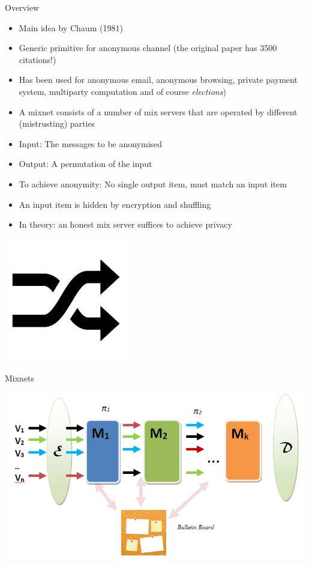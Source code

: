 \documentclass{beamer}
\newcommand*{\addsp}{\usebeamertemplate*{section page1}}
\begin{document}
\begin{frame}
\addsp
\end{frame}

\begin{frame}{Overview}
\begin{itemize}
\item Main idea by Chaum (1981)
\item Generic primitive for anonymous channel (the original paper has 3500 citations!)
\item Has been used for anonymous email, anonymous browsing, private payment system, multiparty computation and of course \textit{elections})
\item A mixnet consists of a number of mix servers that are operated by different (mistrusting) parties
\item Input: The messages to be anonymised
\item Output: A permutation of the input
\item To achieve anonymity: No single output item, must match an input item
\item An input item is hidden by encryption and shuffling
\item In theory: an honest mix server suffices to achieve privacy
\end{itemize}
\begin{center}
\includegraphics[scale=0.3]{shuffle.jpg}
\end{center}
\end{frame} 

\begin{frame}{Mixnets}
\begin{center}
\includegraphics[scale=0.4]{mix.jpg}
\end{center}
\end{frame} 
\end{document}
